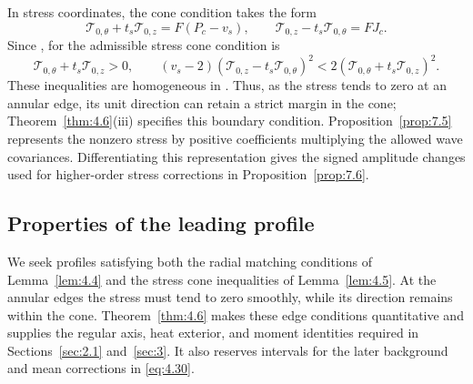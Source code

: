 In stress coordinates, the cone condition takes the form
\begin{equation}
  \mathcal{T}_{0,\theta}+t_s\mathcal{T}_{0,z}=F(P_c-v_s),\qquad
  \mathcal{T}_{0,z}-t_s\mathcal{T}_{0,\theta}=FJ_c.
  \tag{4.23}\label{eq:4.23}
\end{equation}
Since , for  the admissible stress cone condition is
\[
  \mathcal{T}_{0,\theta}+t_s\mathcal{T}_{0,z}>0,
  \qquad
  (v_s-2)(\mathcal{T}_{0,z}-t_s\mathcal{T}_{0,\theta})^2
  <2(\mathcal{T}_{0,\theta}+t_s\mathcal{T}_{0,z})^2.
\]
These inequalities are homogeneous in . Thus, as the stress tends to zero at an annular edge, its unit direction can retain a strict margin in the cone; Theorem~\ref{thm:4.6}(iii) specifies this boundary condition. Proposition~\ref{prop:7.5} represents the nonzero stress by positive coefficients multiplying the allowed wave covariances. Differentiating this representation gives the signed amplitude changes used for higher-order stress corrections in Proposition~\ref{prop:7.6}.

\subsection{Properties of the leading profile}\label{sec:4.4}

We seek profiles  satisfying both the radial matching conditions of Lemma~\ref{lem:4.4} and the stress cone inequalities of Lemma~\ref{lem:4.5}. At the annular edges the stress  must tend to zero smoothly, while its direction remains within the cone. Theorem~\ref{thm:4.6} makes these edge conditions quantitative and supplies the regular axis, heat exterior, and moment identities required in Sections~\ref{sec:2.1} and~\ref{sec:3}. It also reserves intervals for the later background and mean corrections in \eqref{eq:4.30}.

